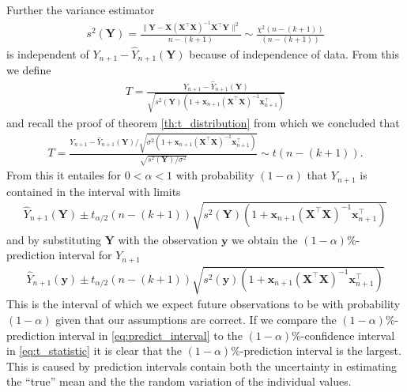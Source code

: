 Further the variance estimator
\begin{align*}
    s^2(\textbf{Y})=\frac{\|\textbf{Y} - \textbf{X}( \textbf{X}^\top\textbf{X} )^{-1}\textbf{X}^\top\textbf{Y}\|^2}{n-(k+1)} \sim \frac{\chi^2(n-(k+1))}{(n-(k+1))}
\end{align*}
is independent of $Y_{n+1}-\hat{Y}_{n+1}(\textbf{Y})$ because of independence of data.
From this we define
\begin{align*}
    T=\frac{Y_{n+1}-\hat{Y}_{n+1}(\textbf{Y})}{\sqrt{s^2(\textbf{Y})(1+\textbf{x}_{n+1}(\textbf{X}^\top\textbf{X})^{-1}\textbf{x}^\top_{n+1})}}
\end{align*}
and recall the proof of theorem \ref{th:t_distribution} from which we concluded that
\begin{align*}
    T=\frac{Y_{n+1}-\hat{Y}_{n+1}(\textbf{Y})/\sqrt{\sigma^2(1+\textbf{x}_{n+1}(\textbf{X}^\top\textbf{X})^{-1}\textbf{x}^\top_{n+1})}}{\sqrt{s^2(\textbf{Y})/\sigma^2}} \sim t(n-(k+1)).
\end{align*}
From this it entailes for $0<\alpha<1$ with probability $(1-\alpha)$ that $Y_{n+1}$ is contained in the interval with limits
\begin{align*}
    \hat{Y}_{n+1}(\textbf{Y})\pm t_{\alpha/2}(n-(k+1))\sqrt{s^2(\textbf{Y})(1+\textbf{x}_{n+1}(\textbf{X}^\top\textbf{X})^{-1}\textbf{x}^\top_{n+1})}
\end{align*}
and by substituting $\textbf{Y}$ with the observation $\textbf{y}$ we obtain the $(1-\alpha)\%$-prediction interval for $Y_{n+1}$
\begin{align} \label{eq:predict_interval}
    \hat{Y}_{n+1}(\textbf{y})\pm t_{\alpha/2}(n-(k+1))\sqrt{s^2(\textbf{y})(1+\textbf{x}_{n+1}(\textbf{X}^\top\textbf{X})^{-1}\textbf{x}^\top_{n+1})}
\end{align}
This is the interval of which we expect future observations to be with probability $(1-\alpha)$ given that our assumptions are correct.
If we compare the $(1-\alpha)\%$-prediction interval in \eqref{eq:predict_interval} to the $(1-\alpha)\%$-confidence interval in \eqref{eq:t_statistic} it is clear that the $(1-\alpha)\%$-prediction interval is the largest.
This is caused by prediction intervals contain both the uncertainty in estimating the ``true'' mean and the the random variation of the individual values.

